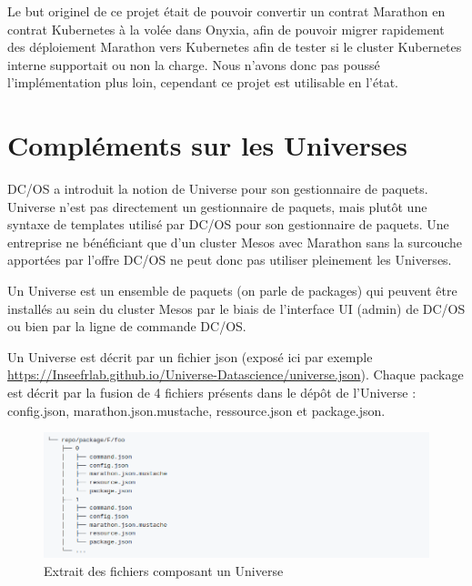 \documentclass[11pt,fleqn]{book} %
\begin{document}
Le but originel de ce projet était de pouvoir convertir un contrat Marathon en contrat Kubernetes à la volée dans Onyxia, afin de pouvoir migrer rapidement des déploiement Marathon vers Kubernetes afin de tester si le cluster Kubernetes interne supportait ou non la charge. Nous n'avons donc pas poussé l'implémentation plus loin, cependant ce projet est utilisable en l'état.




\chapter{Compléments sur les Universes}
\label{Universe}
\vspace{-2cm}
DC/OS a introduit la notion de Universe pour son gestionnaire de paquets. Universe n'est pas directement un gestionnaire de paquets, mais plutôt une syntaxe de templates  utilisé par DC/OS pour son gestionnaire de paquets. Une entreprise ne bénéficiant que d'un cluster Mesos avec Marathon sans la surcouche apportées par l'offre DC/OS ne peut donc pas utiliser pleinement les Universes. \newline

Un Universe est un ensemble de paquets (on parle de packages) qui peuvent être installés au sein du cluster Mesos par le biais de l'interface UI (admin) de DC/OS ou bien par la ligne de commande DC/OS.\newline


Un Universe est décrit par un fichier json (exposé ici par exemple \url{https://Inseefrlab.github.io/Universe-Datascience/universe.json}). Chaque package  est décrit par la fusion de 4 fichiers présents dans le dépôt de l'Universe : config.json, marathon.json.mustache, ressource.json et package.json.

\begin{figure}[H]\centering
\renewcommand{\figurename}{Capture d'écran}
\includegraphics[scale=0.5,trim={0 0 20cm 0},clip ]{Pictures/Comparaison/deployer/universe/universe-repo.png}
\captionsetup{margin=1.5cm,format=hang,justification=justified}
\caption[]{Extrait des fichiers composant un Universe \newline}
\end{figure}
\end{document}
